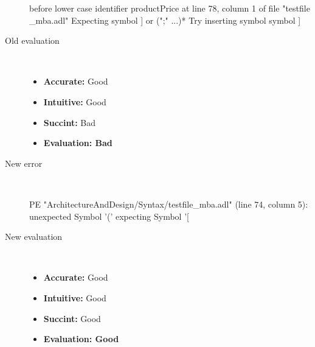 \begin{description}
\begin{haskell}
before lower case identifier productPrice at line 78, column 1 of file "testfile
_mba.adl"
Expecting symbol ] or (";" ...)*
Try inserting symbol symbol ]
\end{haskell}
  \item[Old evaluation]~\\
    \begin{itemize}
    \item \textbf{Accurate:} Good
    \item \textbf{Intuitive:} Good
    \item \textbf{Succint:} Bad
    \item \textbf{Evaluation: Bad}
    \end{itemize}
  \item[New error]~\\
\begin{haskell}
PE "ArchitectureAndDesign/Syntax/testfile_mba.adl" (line 74, column 5):
unexpected Symbol '('
expecting Symbol '[\end{haskell}
  \item[New evaluation]~\\
    \begin{itemize}
    \item \textbf{Accurate:} Good
    \item \textbf{Intuitive:} Good
    \item \textbf{Succint:} Good
    \item \textbf{Evaluation: Good
}
    \end{itemize}
  \end{description}

\hrulefill

